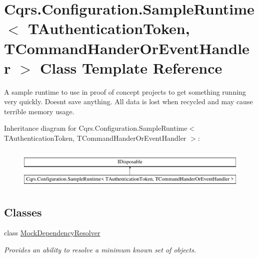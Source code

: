 \hypertarget{classCqrs_1_1Configuration_1_1SampleRuntime}{}\section{Cqrs.\+Configuration.\+Sample\+Runtime$<$ T\+Authentication\+Token, T\+Command\+Hander\+Or\+Event\+Handler $>$ Class Template Reference}
\label{classCqrs_1_1Configuration_1_1SampleRuntime}


A sample runtime to use in proof of concept projects to get something running very quickly. Doesn\textquotesingle{}t save anything. All data is lost when recycled and may cause terrible memory usage.  


Inheritance diagram for Cqrs.\+Configuration.\+Sample\+Runtime$<$ T\+Authentication\+Token, T\+Command\+Hander\+Or\+Event\+Handler $>$\+:\begin{figure}[H]
\begin{center}
\leavevmode
\includegraphics[height=1.982301cm]{classCqrs_1_1Configuration_1_1SampleRuntime}
\end{center}
\end{figure}
\subsection*{Classes}
\begin{DoxyCompactItemize}
\item 
class \hyperlink{classCqrs_1_1Configuration_1_1SampleRuntime_1_1MockDependencyResolver}{Mock\+Dependency\+Resolver}
\begin{DoxyCompactList}\small\item\em Provides an ability to resolve a minimum known set of objects. \end{DoxyCompactList}\end{DoxyCompactItemize}
